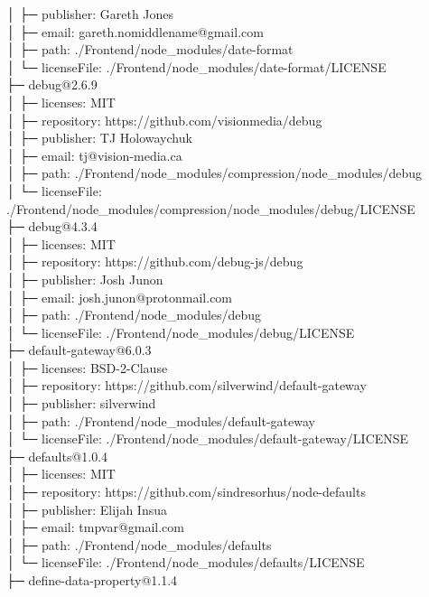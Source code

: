 │  ├─ publisher: Gareth Jones\\
│  ├─ email: gareth.nomiddlename@gmail.com\\
│  ├─ path: ./Frontend/node\_modules/date-format\\
│  └─ licenseFile: ./Frontend/node\_modules/date-format/LICENSE\\
├─ debug@2.6.9\\
│  ├─ licenses: MIT\\
│  ├─ repository: https://github.com/visionmedia/debug\\
│  ├─ publisher: TJ Holowaychuk\\
│  ├─ email: tj@vision-media.ca\\
│  ├─ path: ./Frontend/node\_modules/compression/node\_modules/debug\\
│  └─ licenseFile: ./Frontend/node\_modules/compression/node\_modules/debug/LICENSE\\
├─ debug@4.3.4\\
│  ├─ licenses: MIT\\
│  ├─ repository: https://github.com/debug-js/debug\\
│  ├─ publisher: Josh Junon\\
│  ├─ email: josh.junon@protonmail.com\\
│  ├─ path: ./Frontend/node\_modules/debug\\
│  └─ licenseFile: ./Frontend/node\_modules/debug/LICENSE\\
├─ default-gateway@6.0.3\\
│  ├─ licenses: BSD-2-Clause\\
│  ├─ repository: https://github.com/silverwind/default-gateway\\
│  ├─ publisher: silverwind\\
│  ├─ path: ./Frontend/node\_modules/default-gateway\\
│  └─ licenseFile: ./Frontend/node\_modules/default-gateway/LICENSE\\
├─ defaults@1.0.4\\
│  ├─ licenses: MIT\\
│  ├─ repository: https://github.com/sindresorhus/node-defaults\\
│  ├─ publisher: Elijah Insua\\
│  ├─ email: tmpvar@gmail.com\\
│  ├─ path: ./Frontend/node\_modules/defaults\\
│  └─ licenseFile: ./Frontend/node\_modules/defaults/LICENSE\\
├─ define-data-property@1.1.4\\
